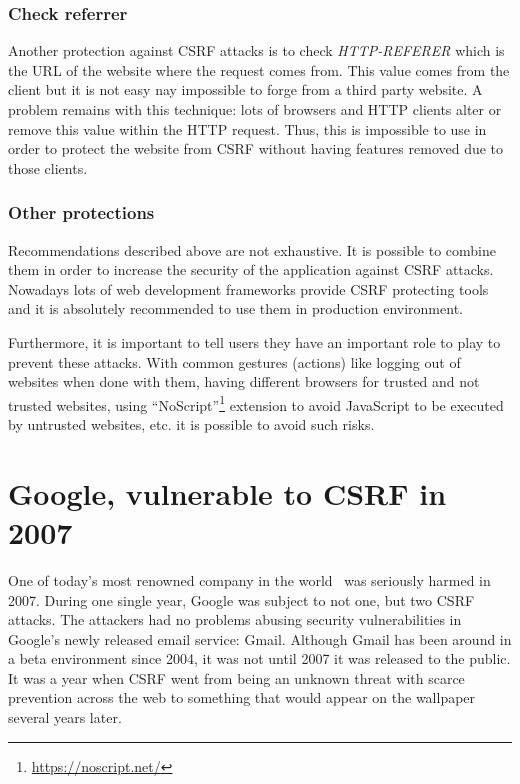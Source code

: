 \documentclass[a4paper,11pt,openany]{report}
\begin{document}
  \subsubsection{Check referrer}
  Another protection against CSRF attacks is to check \textit{HTTP-REFERER} which is the URL of the 
  website where the request comes from. This value comes from the client but it is not easy nay impossible 
  to forge from a third party website. A problem remains with this technique: lots of browsers and HTTP 
  clients alter or remove this value within the HTTP request. Thus, this is impossible to use in order 
  to protect the website from CSRF without having features removed due to those clients.
   
  \subsubsection{Other protections}  
  Recommendations described above are not exhaustive. It is possible to combine them in order to increase 
  the security of the application against CSRF attacks. Nowadays lots of web development frameworks provide 
  CSRF protecting tools and it is absolutely recommended to use them in production environment.
  
  Furthermore, it is important to tell users they have an important role to play to prevent these attacks. 
  With common gestures (actions) like logging out of websites when done with them, having different browsers 
  for trusted and not trusted websites, using ``NoScript''\footnote{\url{https://noscript.net/}} extension to 
  avoid JavaScript to be executed by untrusted websites, etc. it is possible to avoid such risks.
  
  \section{Google, vulnerable to CSRF in 2007}
  One of today's most renowned company in the world~\cite{forbes} was seriously harmed in 2007. During one single year, 
  Google was subject to not one, but two CSRF attacks. The attackers had no problems abusing security 
  vulnerabilities in Google's newly released email service: Gmail. Although Gmail has been around in a beta 
  environment since 2004, it was not until 2007 it was released to the public. It was a year when CSRF went from 
  being an unknown threat with scarce prevention across the web to something that would appear on the wallpaper 
  several years later.
  
\end{document}
